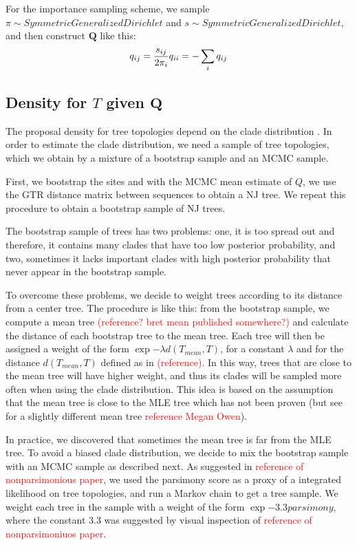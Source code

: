 \documentclass[useAMS,usenatbib]{biom}
\newcommand{\falta}[1]{\textcolor{red}{#1}}
\begin{document}
For the importance sampling scheme, we sample $\pi\sim
SymmetricGeneralizedDirichlet$ and $s\sim
SymmetricGeneralizedDirichlet$, and then construct $\mathbf{Q}$ like
this:
\begin{equation}
q_{ij} = \frac{s_{ij}}{2\pi_i} \\
q_{ii} = -\sum_i q_{ij}
\end{equation}



\subsection{Density for $T$ given $\mathbf{Q}$}
The proposal density for tree topologies depend on the clade
distribution \citep{Larget2013}. In order to estimate the clade
distribution, we need a sample of tree topologies, which we obtain by
a mixture of a bootstrap sample and an MCMC sample.

First, we bootstrap the sites and with the MCMC mean estimate of $Q$,
we use the GTR distance matrix between sequences to obtain a NJ tree.
We repeat this procedure to obtain a bootstrap sample of NJ trees.

The bootstrap sample of trees has two problems: one, it is too spread
out and therefore, it contains many clades that have too low posterior
probability, and two, sometimes it lacks important clades with high
posterior probability that never appear in the bootstrap
sample. 

To overcome these problems, we decide to weight trees according to its
distance from a center tree. The procedure is like this: from the
bootstrap sample, we compute a mean tree \falta{(reference? bret mean
  published somewhere?)} and calculate the distance of each bootstrap
tree to the mean tree. Each tree will then be assigned a weight of the
form $\exp{-\lambda d(T_{mean},T)}$, for a constant $\lambda$ and for
the distance $d(T_{mean},T)$ defined as in \falta{(reference)}. In
this way, trees that are close to the mean tree will have higher
weight, and thus its clades will be sampled more often when using the
clade distribution. This idea is based on the assumption that the mean
tree is close to the MLE tree which has not been proven (but see for a
slightly different mean tree \falta{reference Megan Owen}).

In practice, we discovered that sometimes the mean tree is far from
the MLE tree. To avoid a biased clade distribution, we decide to mix
the bootstrap sample with an MCMC sample as described next. As
suggested in \falta{reference of nonparsimonious paper}, we used the
parsimony score as a proxy of a integrated likelihood on tree
topologies, and run a Markov chain to get a tree sample. We weight
each tree in the sample with a weight of the form $\exp{-3.3
  parsimony}$, where the constant $3.3$ was suggested by visual
inspection of \falta{reference of nonparsimoniuos paper}.
\end{document}
